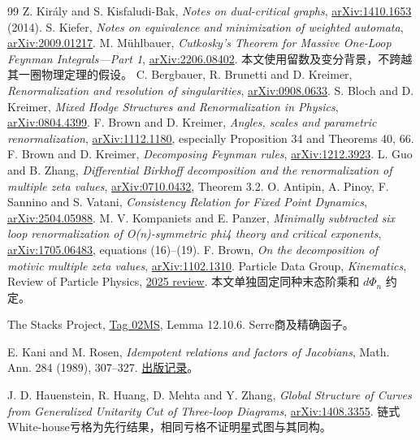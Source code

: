 \documentclass[11pt,a4paper,oneside]{ctexart}
\theoremstyle{cnplain}
\theoremstyle{definition}
\theoremstyle{remark}
\numberwithin{equation}{section}
\begin{document}
\begin{thebibliography}{99}
 Z. Király and S. Kisfaludi-Bak, \emph{Notes on dual-critical graphs}, \href{https://arxiv.org/abs/1410.1653}{arXiv:1410.1653} (2014).
 S. Kiefer, \emph{Notes on equivalence and minimization of weighted automata}, \href{https://arxiv.org/abs/2009.01217}{arXiv:2009.01217}.
 M. Mühlbauer, \emph{Cutkosky's Theorem for Massive One-Loop Feynman Integrals---Part 1}, \href{https://arxiv.org/abs/2206.08402}{arXiv:2206.08402}. 本文使用留数及变分背景，不跨越其一圈物理定理的假设。
 C. Bergbauer, R. Brunetti and D. Kreimer, \emph{Renormalization and resolution of singularities}, \href{https://arxiv.org/abs/0908.0633}{arXiv:0908.0633}.
 S. Bloch and D. Kreimer, \emph{Mixed Hodge Structures and Renormalization in Physics}, \href{https://arxiv.org/abs/0804.4399}{arXiv:0804.4399}.
 F. Brown and D. Kreimer, \emph{Angles, scales and parametric renormalization}, \href{https://arxiv.org/abs/1112.1180}{arXiv:1112.1180}, especially Proposition 34 and Theorems 40, 66.
 F. Brown and D. Kreimer, \emph{Decomposing Feynman rules}, \href{https://arxiv.org/abs/1212.3923}{arXiv:1212.3923}.
 L. Guo and B. Zhang, \emph{Differential Birkhoff decomposition and the renormalization of multiple zeta values}, \href{https://arxiv.org/abs/0710.0432}{arXiv:0710.0432}, Theorem 3.2.
 O. Antipin, A. Pinoy, F. Sannino and S. Vatani, \emph{Consistency Relation for Fixed Point Dynamics}, \href{https://arxiv.org/abs/2504.05988}{arXiv:2504.05988}.
 M. V. Kompaniets and E. Panzer, \emph{Minimally subtracted six loop renormalization of O(n)-symmetric phi4 theory and critical exponents}, \href{https://arxiv.org/abs/1705.06483}{arXiv:1705.06483}, equations (16)--(19).
 F. Brown, \emph{On the decomposition of motivic multiple zeta values}, \href{https://arxiv.org/abs/1102.1310}{arXiv:1102.1310}.
 Particle Data Group, \emph{Kinematics}, Review of Particle Physics, \href{https://pdg.lbl.gov/2025/reviews/rpp2025-rev-kinematics.pdf}{2025 review}. 本文单独固定同种末态阶乘和 $d\Phi_n$ 约定。

The Stacks Project,
\href{https://stacks.math.columbia.edu/tag/02MS}{Tag 02MS},
Lemma 12.10.6. Serre商及精确函子。

E. Kani and M. Rosen,
\emph{Idempotent relations and factors of Jacobians},
Math. Ann. 284 (1989), 307--327.
\href{https://eudml.org/doc/164555}{出版记录}。


J. D. Hauenstein, R. Huang, D. Mehta and Y. Zhang,
\emph{Global Structure of Curves from Generalized Unitarity Cut of Three-loop Diagrams},
\href{https://arxiv.org/abs/1408.3355}{arXiv:1408.3355}.
链式White-house亏格为先行结果，相同亏格不证明星式图与其同构。


\end{thebibliography}
\end{document}
